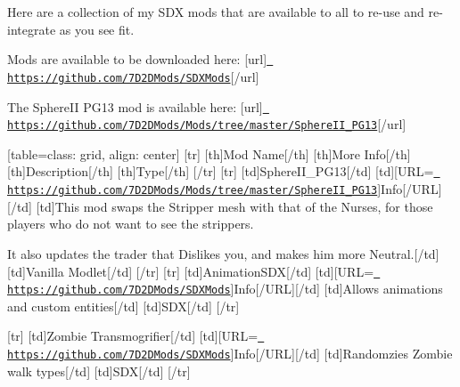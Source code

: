 Here are a collection of my S\+DX mods that are available to all to re-\/use and re-\/integrate as you see fit.

Mods are available to be downloaded here\+: \mbox{[}url\mbox{]}\href{https://github.com/7D2DMods/SDXMods}{\texttt{ https\+://github.\+com/7\+D2\+D\+Mods/\+S\+D\+X\+Mods}}\mbox{[}/url\mbox{]}

The Sphere\+II P\+G13 mod is available here\+: \mbox{[}url\mbox{]}\href{https://github.com/7D2DMods/Mods/tree/master/SphereII_PG13}{\texttt{ https\+://github.\+com/7\+D2\+D\+Mods/\+Mods/tree/master/\+Sphere\+I\+I\+\_\+\+P\+G13}}\mbox{[}/url\mbox{]}

\mbox{[}table=class\+: grid, align\+: center\mbox{]} \mbox{[}tr\mbox{]} \mbox{[}th\mbox{]}Mod Name\mbox{[}/th\mbox{]} \mbox{[}th\mbox{]}More Info\mbox{[}/th\mbox{]} \mbox{[}th\mbox{]}Description\mbox{[}/th\mbox{]} \mbox{[}th\mbox{]}Type\mbox{[}/th\mbox{]} \mbox{[}/tr\mbox{]} \mbox{[}tr\mbox{]} \mbox{[}td\mbox{]}Sphere\+I\+I\+\_\+\+P\+G13\mbox{[}/td\mbox{]} \mbox{[}td\mbox{]}\mbox{[}U\+RL=\href{https://github.com/7D2DMods/Mods/tree/master/SphereII_PG13}{\texttt{ https\+://github.\+com/7\+D2\+D\+Mods/\+Mods/tree/master/\+Sphere\+I\+I\+\_\+\+P\+G13}}\mbox{]}Info\mbox{[}/\+U\+RL\mbox{]}\mbox{[}/td\mbox{]} \mbox{[}td\mbox{]}This mod swaps the Stripper mesh with that of the Nurses\textquotesingle{}, for those players who do not want to see the strippers.

It also updates the trader that Dislikes you, and makes him more Neutral.\mbox{[}/td\mbox{]} \mbox{[}td\mbox{]}Vanilla Modlet\mbox{[}/td\mbox{]} \mbox{[}/tr\mbox{]} \mbox{[}tr\mbox{]} \mbox{[}td\mbox{]}Animation\+S\+DX\mbox{[}/td\mbox{]} \mbox{[}td\mbox{]}\mbox{[}U\+RL=\href{https://github.com/7D2DMods/SDXMods}{\texttt{ https\+://github.\+com/7\+D2\+D\+Mods/\+S\+D\+X\+Mods}}\mbox{]}Info\mbox{[}/\+U\+RL\mbox{]}\mbox{[}/td\mbox{]} \mbox{[}td\mbox{]}Allows animations and custom entities\mbox{[}/td\mbox{]} \mbox{[}td\mbox{]}S\+DX\mbox{[}/td\mbox{]} \mbox{[}/tr\mbox{]}

\mbox{[}tr\mbox{]} \mbox{[}td\mbox{]}Zombie Transmogrifier\mbox{[}/td\mbox{]} \mbox{[}td\mbox{]}\mbox{[}U\+RL=\href{https://github.com/7D2DMods/SDXMods}{\texttt{ https\+://github.\+com/7\+D2\+D\+Mods/\+S\+D\+X\+Mods}}\mbox{]}Info\mbox{[}/\+U\+RL\mbox{]}\mbox{[}/td\mbox{]} \mbox{[}td\mbox{]}Randomzies Zombie walk types\mbox{[}/td\mbox{]} \mbox{[}td\mbox{]}S\+DX\mbox{[}/td\mbox{]} \mbox{[}/tr\mbox{]}

